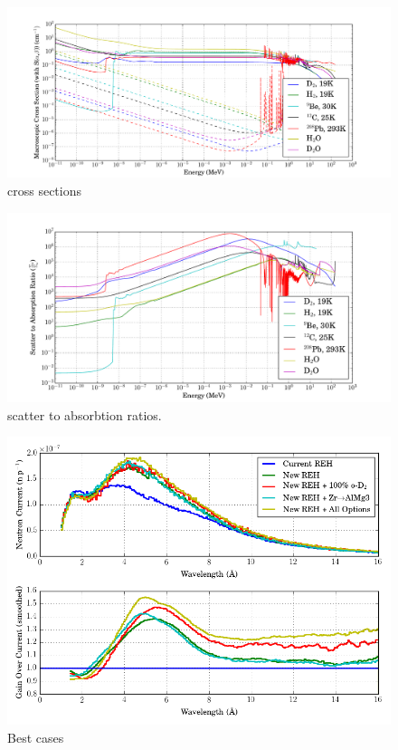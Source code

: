 \documentclass[preprint,12pt]{elsarticle}
\begin{document}
\begin{figure}
\begin{center}
\includegraphics[scale=0.45]{graphics/xs.pdf}
\end{center}
\caption{\label{cross_sections}cross sections}
\end{figure}

\begin{figure}
\begin{center}
\includegraphics[scale=0.45]{graphics/ScattAbs.pdf}
\end{center}
\caption{\label{scattabs}scatter to absorbtion ratios.}
\end{figure}


\begin{figure}
\begin{center}
\includegraphics[scale=0.45]{graphics/best_cases.png}
\end{center}
\caption{\label{parametric_gain}Best cases}
\end{figure}
\end{document}
